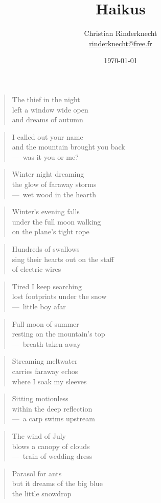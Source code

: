 \documentclass[a4paper,12pt]{article}
\title{Haikus}
\author{Christian Rinderknecht\\
{\small \url{rinderknecht@free.fr}}}
\date{\today}
\begin{document}
\begin{verse}
  The thief in the night \\
  left a window wide open \\
  and dreams of autumn
\end{verse}

\begin{verse}
  I called out your name \\
  and the mountain brought you back \\
  ---~was it you or me?
\end{verse}

\begin{verse}
  Winter night dreaming \\
  the glow of faraway storms \\
  ---~wet wood in the hearth
\end{verse}

\begin{verse}
  Winter's evening falls \\
  under the full moon walking \\
  on the plane's tight rope
\end{verse}

\begin{verse}
  Hundreds of swallows \\
  sing their hearts out on the staff \\
  of electric wires
\end{verse}

\begin{verse}
  Tired I keep searching \\
  lost footprints under the snow \\
  ---~little boy afar
\end{verse}

\begin{verse}
  Full moon of summer \\
  resting on the mountain's top \\
  ---~breath taken away
\end{verse}

\begin{verse}
  Streaming meltwater \\
  carries faraway echos \\
  where I soak my sleeves
\end{verse}

\begin{verse}
  Sitting motionless \\
  within the deep reflection \\
  ---~a carp swims upstream
\end{verse}

\begin{verse}
  The wind of July \\
  blows a canopy of clouds \\
  ---~train of wedding dress
\end{verse}

\begin{verse}
  Parasol for ants \\
  but it dreams of the big blue \\
  the little snowdrop
\end{verse}
\end{document}
